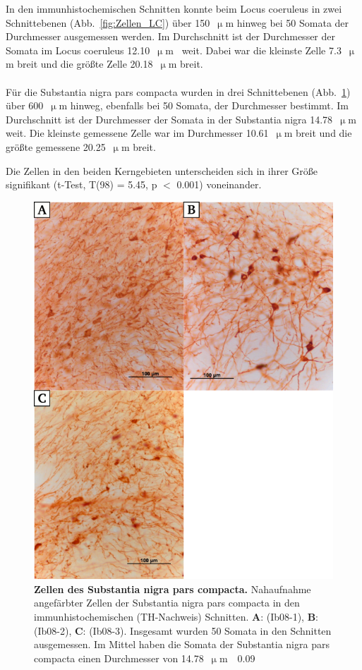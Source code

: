 \newpage
In den immunhistochemischen Schnitten konnte beim Locus coeruleus  in zwei Schnittebenen (Abb.~\ref{fig:Zellen_LC}) über 150~$\upmu$m hinweg bei 50 Somata der Durchmesser ausgemessen werden. Im Durchschnitt ist der Durchmesser der Somata im Locus coeruleus 12.10~$\upmu$m~ weit. Dabei war die kleinste Zelle 7.3~$\upmu$m breit und die größte Zelle 20.18~$\upmu$m breit.
\\
\\
Für die Substantia nigra pars compacta  wurden in drei Schnittebenen (Abb.~\ref{fig:Zellen_SNC}) über 600~$\upmu$m hinweg, ebenfalls bei 50 Somata, der Durchmesser bestimmt. Im Durchschnitt ist der Durchmesser der Somata in der Substantia nigra 14.78~$\upmu$m~ weit. Die kleinste gemessene Zelle war im Durchmesser 10.61~$\upmu$m breit und die größte gemessene 20.25~$\upmu$m breit.

Die Zellen in den beiden Kerngebieten unterscheiden sich in ihrer Größe signifikant (t-Test, T(98) = 5.45, p $<$ 0.001) voneinander.

\begin{figure}[H]
    \centering
    \includegraphics{pictures/Bilder_monoamine_systeme/Zellen_SNC.png}
    \caption[Zellen des Substantia nigra pars compacta]{\textbf{Zellen des Substantia nigra pars compacta.} Nahaufnahme angefärbter Zellen der Substantia nigra pars compacta in den immunhistochemischen (TH-Nachweis) Schnitten. \textbf{A}: (Ib08-1), \textbf{B}: (Ib08-2), \textbf{C}: (Ib08-3). Insgesamt wurden 50 Somata in den Schnitten ausgemessen. Im Mittel haben die Somata der Substantia nigra pars compacta einen Durchmesser von 14.78~$\upmu$m~\rpm~0.09}
    \label{fig:Zellen_SNC}
\end{figure}


